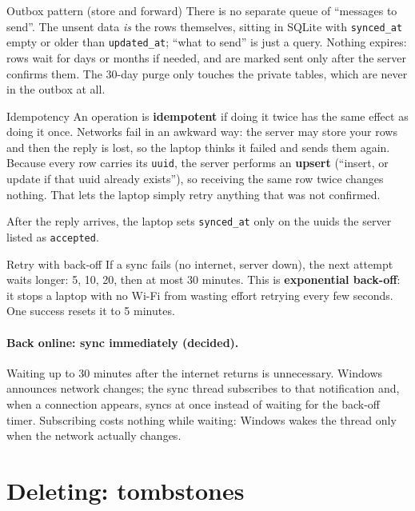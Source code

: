 \documentclass[11pt,a4paper]{article}
\begin{document}
\begin{concept}{Outbox pattern (store and forward)}
There is no separate queue of ``messages to send''. The unsent data \emph{is} the rows
themselves, sitting in SQLite with \texttt{synced\_at} empty or older than \texttt{updated\_at};
``what to send'' is just a query. Nothing expires: rows wait for days or months if needed, and are
marked sent only after the server confirms them. The 30-day purge only touches the private
tables, which are never in the outbox at all.
\end{concept}

\begin{concept}{Idempotency}
An operation is \textbf{idempotent} if doing it twice has the same effect as doing it once.
Networks fail in an awkward way: the server may store your rows and then the reply is lost, so
the laptop thinks it failed and sends them again. Because every row carries its \texttt{uuid},
the server performs an \textbf{upsert} (``insert, or update if that uuid already exists''), so
receiving the same row twice changes nothing. That lets the laptop simply retry anything that
was not confirmed.
\end{concept}

\noindent After the reply arrives, the laptop sets \texttt{synced\_at} only on the uuids the
server listed as \texttt{accepted}.

\begin{concept}{Retry with back-off}
If a sync fails (no internet, server down), the next attempt waits longer: 5, 10, 20, then at
most 30 minutes. This is \textbf{exponential back-off}: it stops a laptop with no Wi-Fi from
wasting effort retrying every few seconds. One success resets it to 5 minutes.
\end{concept}

\paragraph{Back online: sync immediately (decided).} Waiting up to 30 minutes after the
internet returns is unnecessary. Windows announces network changes; the sync thread subscribes
to that notification and, when a connection appears, syncs at once instead of waiting for the
back-off timer. Subscribing costs nothing while waiting: Windows wakes the thread only when the
network actually changes.

\section{Deleting: tombstones}
\end{document}
